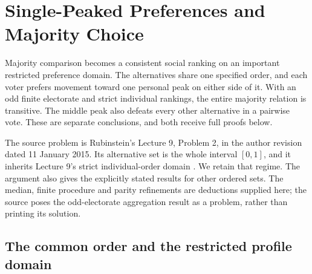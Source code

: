 \chapter{Single-Peaked Preferences and Majority Choice}
\label{sec:p17-single-peaked-majority}

Majority comparison becomes a consistent social ranking on an important
restricted preference domain. The alternatives share one specified order,
and each voter prefers movement toward one personal peak on either side
of it. With an odd finite electorate and strict individual rankings, the
entire majority relation is transitive. The middle peak also defeats every
other alternative in a pairwise vote. These are separate conclusions, and
both receive full proofs below.

The source problem is Rubinstein's Lecture 9, Problem 2, in the author
revision dated 11 January 2015. Its alternative set is the whole interval
\([0,1]\), and it inherits Lecture 9's strict individual-order domain
\cite[pp.~123, 128]{Rubinstein2015LectureNotes}. We retain that regime.
The argument also gives the explicitly stated results for other ordered
sets. The median, finite procedure and parity refinements are deductions
supplied here; the source poses the odd-electorate aggregation result
as a problem, rather than printing its solution.

\section{The common order and the restricted profile domain}
\label{sec:p17-single-peaked-domain}

